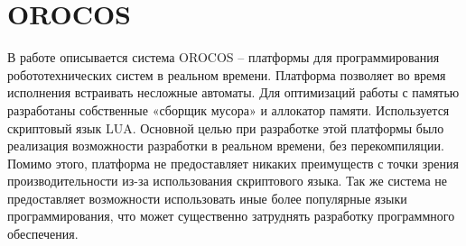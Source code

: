\section{OROCOS}

В работе \cite{klotzbucher2010orocos}  описывается система OROCOS – платформы для программирования робототехнических систем в реальном времени. Платформа позволяет во время исполнения встраивать несложные автоматы. Для оптимизаций работы с памятью разработаны собственные «сборщик мусора» и аллокатор памяти. Используется скриптовый язык LUA. Основной целью при разработке этой платформы было реализация возможности разработки в реальном времени, без перекомпиляции. Помимо этого, платформа не предоставляет никаких преимуществ с точки зрения производительности из-за использования скриптового языка. Так же система не предоставляет возможности использовать иные более популярные языки программирования, что может существенно затруднять разработку программного обеспечения.